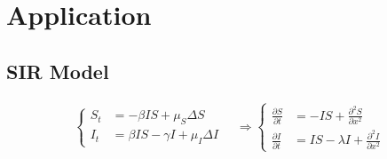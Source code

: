 \chapter{Application}

\section{SIR Model}
\begin{align}
    \begin{cases}
        S_t &= -\beta IS + \mu_S \Delta S \\
        I_t &= \beta IS - \gamma I + \mu_I \Delta I
    \end{cases}
    \quad \Rightarrow
    \begin{cases}
        \frac{\partial S}{\partial t} &= -IS + \frac{\partial^2 S}{\partial x^2} \\
        \frac{\partial I}{\partial t} &= IS - \lambda I + \frac{\partial^2 I}{\partial x^2}
    \end{cases}
\end{align}


